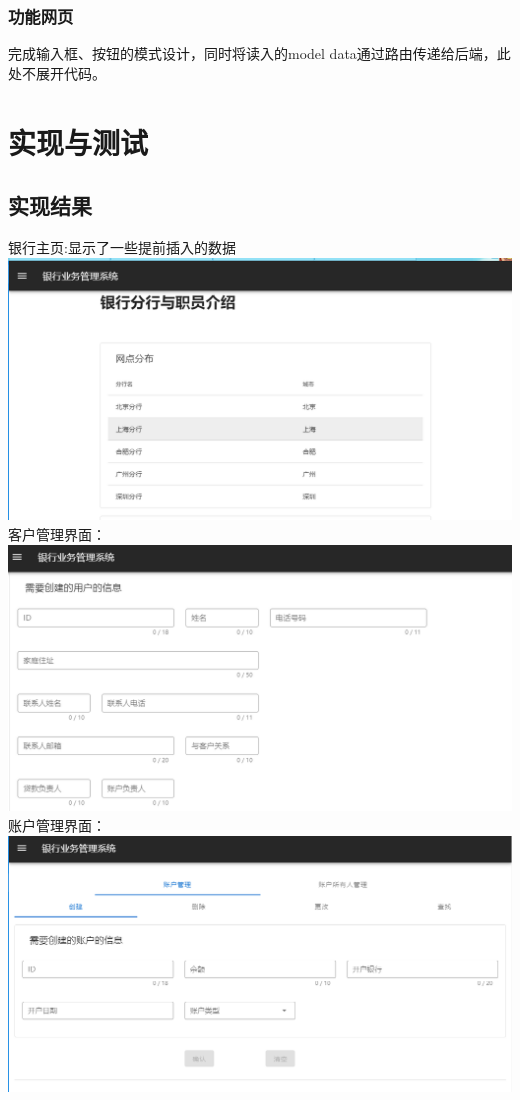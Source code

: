 \documentclass{article}
\begin{document}
	\subsubsection{功能网页}
	完成输入框、按钮的模式设计，同时将读入的model data通过路由传递给后端，此处不展开代码。
	\section{实现与测试}
	\subsection{实现结果}
	银行主页:显示了一些提前插入的数据\\
	\includegraphics*[scale=0.4]{1.png}\\
	客户管理界面：\\
	\includegraphics*[scale=0.4]{2.png}\\
	账户管理界面：\\
	\includegraphics*[scale=0.4]{3.png}\\
\end{document}
